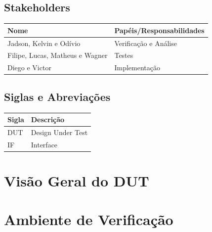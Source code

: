 \documentclass{article}
\begin{document}
	\subsection{Stakeholders}
  \FloatBarrier
  \begin{table}[H] 
    \begin{center}
      \begin{tabular}[pos]{|m{5cm} | m{8cm}|} 
        \hline %
        \cellcolor[gray]{0.9}\textbf{Nome} & \cellcolor[gray]{0.9}
		\textbf{Papéis/Responsabilidades} \\ 
        \hline Jadson, Kelvin e Odívio & Verificação e Análise \\ \hline
         Filipe, Lucas, Matheus e Wagner & Testes \\ \hline
         Diego e Victor & Implementação \\ \hline
      \end{tabular}
    \end{center}
  \end{table} 
  
  \subsection{Siglas e Abreviações}
  \FloatBarrier
  \begin{table}[H]
    \begin{center}
      \begin{tabular}[pos]{|m{2cm} | m{11cm}|} 
				\hline 
				\cellcolor[gray]{0.9}\textbf{Sigla} & \cellcolor[gray]{0.9}\textbf{Descrição} \\ \hline
				DUT		& Design Under Test \\ \hline
        IF    & Interface \\ \hline
      \end{tabular}
    \end{center}
  \end{table}  

	\newpage
	\section{Visão Geral do DUT}
	
	
  	
	\newpage
	\section{Ambiente de Verificação}
	
\end{document}
